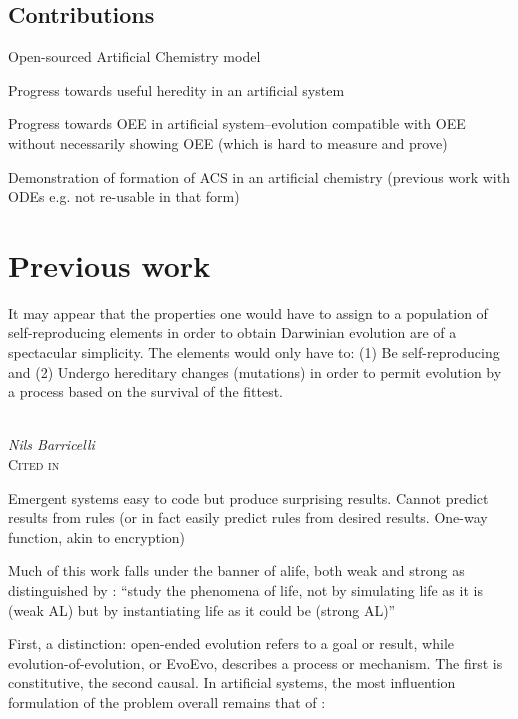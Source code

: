 \section{Contributions}\label{contributions}

\begin{compactenum}
\item Open-sourced Artificial Chemistry model
\item Progress towards useful heredity in an artificial system
\item Progress towards OEE in artificial system--evolution compatible with OEE without necessarily showing OEE (which is hard to measure and prove)
\item Demonstration of formation of ACS in an artificial chemistry (previous work with ODEs e.g. \parencite{Hurndall2014} not re-usable in that form)
\end{compactenum}
\chapter{Previous work}\label{previous-work}

\epigraph{%
	It may appear that the properties one would have to assign to a population of self-reproducing elements in order to obtain Darwinian evolution are of a spectacular simplicity. The elements would only have to: (1) Be self-reproducing and (2) Undergo hereditary changes (mutations) in order to permit evolution by a process based on the survival of the fittest.}%
{\textit{\\Nils Barricelli}\\\textsc{Cited in \cite{Taylor2001}}}

Emergent systems easy to code but produce surprising results. Cannot predict results from rules (or in fact easily predict rules from desired results. One-way function, akin to encryption) \parencite{Nellis2014}

Much of this work falls under the banner of \gls{alife}, both weak and strong as distinguished by \cite{Langton1989}: ``study the phenomena of life, not by simulating life as it is (weak AL) but by instantiating life as it could be (strong AL)''

First, a distinction: open-ended evolution refers to a goal or result, while evolution-of-evolution, or EvoEvo, describes a process or mechanism. The first is constitutive, the second causal. In artificial systems, the most influention formulation of the problem overall remains that of \cite{Bedau:2000mi}:

